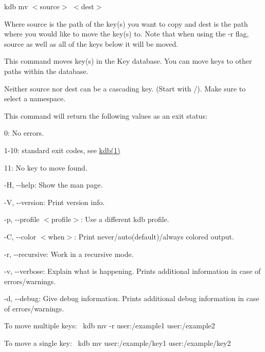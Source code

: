 {\ttfamily kdb mv $<$source$>$ $<$dest$>$}

Where {\ttfamily source} is the path of the key(s) you want to copy and {\ttfamily dest} is the path where you would like to move the key(s) to. Note that when using the {\ttfamily -\/r} flag, {\ttfamily source} as well as all of the keys below it will be moved.

This command moves key(s) in the Key database. You can move keys to other paths within the database.

Neither {\ttfamily source} nor {\ttfamily dest} can be a cascading key. (Start with {\ttfamily /}). Make sure to select a namespace.

This command will return the following values as an exit status\+:


\begin{DoxyItemize}
\item 0\+: No errors.
\item 1-\/10\+: standard exit codes, see \hyperlink{doc_help_kdb_md}{kdb(1)}
\item 11\+: No key to move found.
\end{DoxyItemize}


\begin{DoxyItemize}
\item {\ttfamily -\/H}, {\ttfamily -\/-\/help}\+: Show the man page.
\item {\ttfamily -\/V}, {\ttfamily -\/-\/version}\+: Print version info.
\item {\ttfamily -\/p}, {\ttfamily -\/-\/profile $<$profile$>$}\+: Use a different kdb profile.
\item {\ttfamily -\/C}, {\ttfamily -\/-\/color $<$when$>$}\+: Print never/auto(default)/always colored output.
\item {\ttfamily -\/r}, {\ttfamily -\/-\/recursive}\+: Work in a recursive mode.
\item {\ttfamily -\/v}, {\ttfamily -\/-\/verbose}\+: Explain what is happening. Prints additional information in case of errors/warnings.
\item {\ttfamily -\/d}, {\ttfamily -\/-\/debug}\+: Give debug information. Prints additional debug information in case of errors/warnings.
\end{DoxyItemize}

To move multiple keys\+:~\newline
 {\ttfamily kdb mv -\/r user\+:/example1 user\+:/example2}

To move a single key\+:~\newline
 {\ttfamily kdb mv user\+:/example/key1 user\+:/example/key2} 